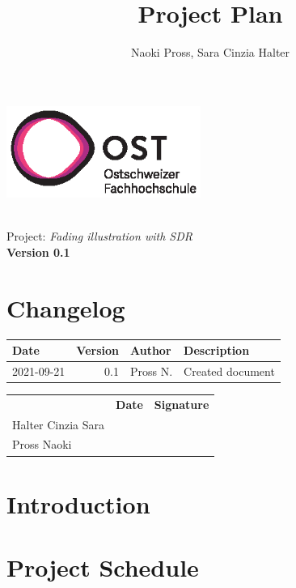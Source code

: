 \documentclass[a4paper, twosided, 11pt]{scrartcl}
\title{Project Plan}
\author{Naoki Pross, Sara Cinzia Halter}
\begin{document}
\begin{titlepage}
	\includegraphics[height=3cm]{fig/ost-logo}
	\begin{flushright}
		\vspace{5cm}
		{\Huge \bfseries \thetitle} \\
		\vspace{5mm}
		{\LARGE Project: \textit{Fading illustration with SDR}} \\
		\vspace{5mm}
		{\LARGE \bfseries Version 0.1}
	\end{flushright}
\end{titlepage}

\section*{Changelog}
\begin{tabularx}{\textwidth}{lrlX}
	\toprule
	\bfseries Date & \bfseries Version & \bfseries Author & \bfseries Description \\
	\midrule
	2021-09-21 & 0.1 & Pross N.  & Created document \\
	\bottomrule
\end{tabularx}

\vfill
{
	\renewcommand{\arraystretch}{2}
	\begin{tabularx}{\textwidth}{lp{}X}
		                   & \bfseries Date & \bfseries Signature\\
		Halter Cinzia Sara & \hrulefill & \hrulefill \\
		Pross Naoki        & \hrulefill & \hrulefill \\
	\end{tabularx}
}

\clearpage
\tableofcontents
\listoffigures
\listoftables
\clearpage

\section{Introduction}

\section{Project Schedule}
\end{document}
